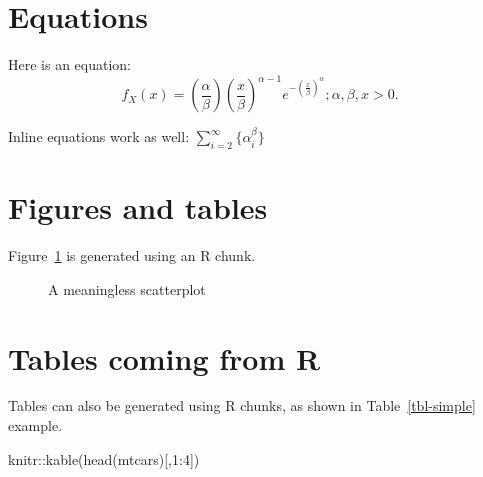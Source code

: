 \documentclass[
  authoryear,
  preprint,
  3p,
  twocolumn]{elsarticle}
\newenvironment{Shaded}{\begin{snugshade}}{\end{snugshade}}
\newcommand{\DecValTok}[1]{\textcolor[rgb]{0.68,0.00,0.00}{#1}}
\newcommand{\FunctionTok}[1]{\textcolor[rgb]{0.28,0.35,0.67}{#1}}
\newcommand{\NormalTok}[1]{\textcolor[rgb]{0.00,0.23,0.31}{#1}}
\newcommand{\SpecialCharTok}[1]{\textcolor[rgb]{0.37,0.37,0.37}{#1}}
\begin{document}
\section{Equations}\label{equations}

Here is an equation: \[ 
  f_{X}(x) = \left(\frac{\alpha}{\beta}\right)
  \left(\frac{x}{\beta}\right)^{\alpha-1}
  e^{-\left(\frac{x}{\beta}\right)^{\alpha}}; 
  \alpha,\beta,x > 0 .
\]

Inline equations work as well: \(\sum_{i = 2}^\infty\{\alpha_i^\beta\}\)

\section{Figures and tables}\label{figures-and-tables}

Figure~\ref{fig-meaningless} is generated using an R chunk.

\begin{figure}


\caption{\label{fig-meaningless}A meaningless scatterplot}

\end{figure}%

\section{Tables coming from R}\label{tables-coming-from-r}

Tables can also be generated using R chunks, as shown in
Table~\ref{tbl-simple} example.

\begin{Shaded}
\begin{Highlighting}[]
\NormalTok{knitr}\SpecialCharTok{::}\FunctionTok{kable}\NormalTok{(}\FunctionTok{head}\NormalTok{(mtcars)[,}\DecValTok{1}\SpecialCharTok{:}\DecValTok{4}\NormalTok{])}
\end{Highlighting}
\end{Shaded}
\end{document}
